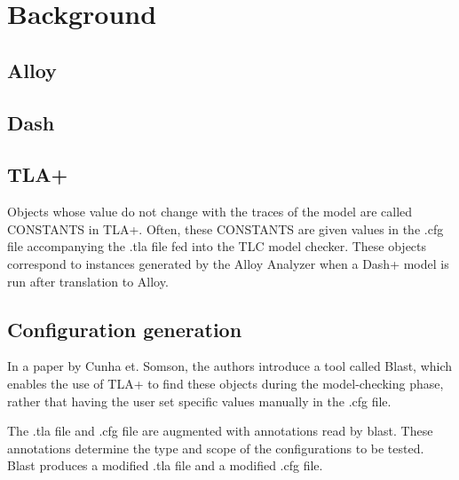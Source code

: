 \chapter{Background}


\section{Alloy}

\section{Dash}

\section{TLA+}


Objects whose value do not change with the traces of the model are called CONSTANTS in TLA+. Often, these CONSTANTS are given values in the .cfg file accompanying the .tla file fed into the TLC model checker. These objects correspond to instances generated by the Alloy Analyzer when a Dash+ model is run after translation to Alloy.

\section{Configuration generation}



In a paper \cite{blast} by Cunha et. Somson, the authors introduce a tool called Blast, which enables the use of TLA+ to find these objects during the model-checking phase, rather that having the user set specific values manually in the .cfg file. 


The .tla file and .cfg file are augmented with annotations read by blast. These annotations determine the type and scope of the configurations to be tested. Blast produces a modified .tla file and a modified .cfg file. 



